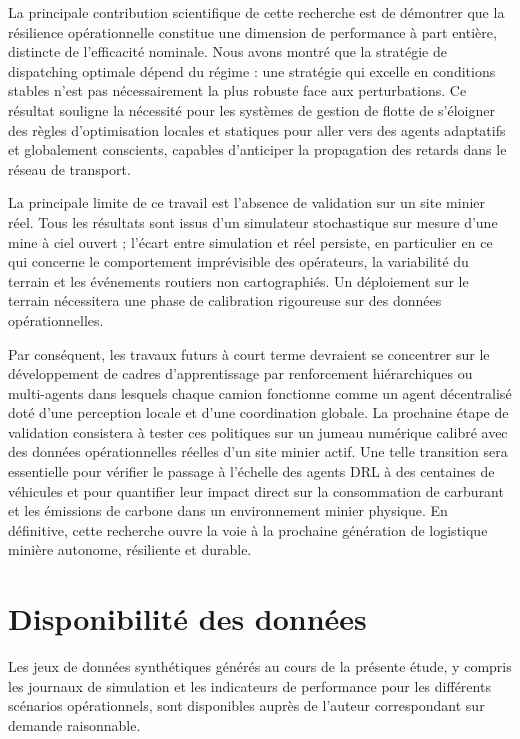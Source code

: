 \documentclass[11pt,a4paper]{article}
\begin{document}
La principale contribution scientifique de cette recherche est de démontrer que la résilience opérationnelle constitue une dimension de performance à part entière, distincte de l'efficacité nominale. Nous avons montré que la stratégie de dispatching optimale dépend du régime : une stratégie qui excelle en conditions stables n'est pas nécessairement la plus robuste face aux perturbations. Ce résultat souligne la nécessité pour les systèmes de gestion de flotte de s'éloigner des règles d'optimisation locales et statiques pour aller vers des agents adaptatifs et globalement conscients, capables d'anticiper la propagation des retards dans le réseau de transport.

La principale limite de ce travail est l'absence de validation sur un site minier réel. Tous les résultats sont issus d'un simulateur stochastique sur mesure d'une mine à ciel ouvert ; l'écart entre simulation et réel persiste, en particulier en ce qui concerne le comportement imprévisible des opérateurs, la variabilité du terrain et les événements routiers non cartographiés. Un déploiement sur le terrain nécessitera une phase de calibration rigoureuse sur des données opérationnelles.

Par conséquent, les travaux futurs à court terme devraient se concentrer sur le développement de cadres d'apprentissage par renforcement hiérarchiques ou multi-agents dans lesquels chaque camion fonctionne comme un agent décentralisé doté d'une perception locale et d'une coordination globale. La prochaine étape de validation consistera à tester ces politiques sur un jumeau numérique calibré avec des données opérationnelles réelles d'un site minier actif. Une telle transition sera essentielle pour vérifier le passage à l'échelle des agents DRL à des centaines de véhicules et pour quantifier leur impact direct sur la consommation de carburant et les émissions de carbone dans un environnement minier physique. En définitive, cette recherche ouvre la voie à la prochaine génération de logistique minière autonome, résiliente et durable.

\newpage

\section*{Disponibilité des données}

Les jeux de données synthétiques générés au cours de la présente étude, y compris les journaux de simulation et les indicateurs de performance pour les différents scénarios opérationnels, sont disponibles auprès de l'auteur correspondant sur demande raisonnable.
\end{document}
